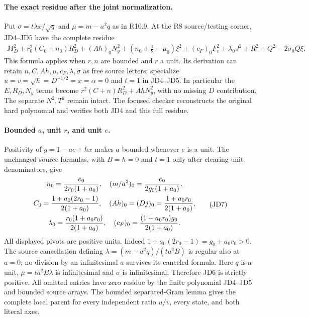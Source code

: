 \paragraph{The exact residue after the joint normalization.}
Put $\sigma=t\lambda x/\sqrt q$ and $\mu=m-a^2q$ as in R10.9.
At the R8 source/testing corner, JD4--JD5 have the complete residue
\[
 \begin{split}
 M_D^2+r_0^2(C_0+n_0)R_D^2+(Ah)_0N_y^2
  +(n_0+\tfrac12-\mu_0)\xi^2
  +(c_F)_0F_v^2+\lambda_0J^2+R^2+Q^2-2\sigma_0Q\xi.
 \end{split}                                                   \tag{JD6}
\]
This formula applies when $r,n$ are bounded and $r$ a unit.  Its
derivation can retain $n,C,Ah,\mu,c_F,\lambda,\sigma$ as free source
letters: specialize $u=v=\sqrt h=D^{-1/2}=x=\alpha=0$ and $t=1$
in JD4--JD5.  In particular the $E,R_D,N_y$ terms become
$r^2(C+n)R_D^2+AhN_y^2$, with no missing $D$ contribution.
The separate $N^2,T^2$ remain intact.  The focused checker reconstructs
the original hard polynomial and verifies both JD4 and this full
residue.

\paragraph{Bounded $a$, unit $r$, and unit $e$.}
Positivity of $g=1-ae+hx$ makes $a$ bounded whenever $e$ is a unit.
The unchanged source formulas, with $B=h=0$ and $t=1$ only after
clearing unit denominators, give
\[
 \begin{gathered}
 n_0={e_0\over2r_0(1+a_0)},\quad
 (m/a^2)_0={e_0\over2g_0(1+a_0)},\\
 C_0={1+a_0(2r_0-1)\over2(1+a_0)},\quad
 (Ah)_0=(Dj)_0={1+a_0r_0\over2(1+a_0)},\\
 \lambda_0={r_0(1+a_0r_0)\over2(1+a_0)},\quad
 (c_F)_0={(1+a_0r_0)g_0\over2(1+a_0)}.                
 \end{gathered}
\tag{JD7}
\]
All displayed pivots are positive units.  Indeed
$1+a_0(2r_0-1)=g_0+a_0r_0>0$.  The source cancellation defining
$\lambda=(m-a^2q)/(ta^2B)$ is regular also at $a=0$; no division
by an infinitesimal $a$ survives its canceled formula.
Here $q$ is a unit, $\mu=ta^2B\lambda$ is infinitesimal and
$\sigma$ is infinitesimal.  Therefore JD6 is strictly positive.
All omitted entries have zero residue by the finite polynomial
JD4--JD5 and bounded source arrays.  The bounded separated-Gram
lemma gives the complete local parent for every independent ratio
$u/v$, every state, and both literal axes.

